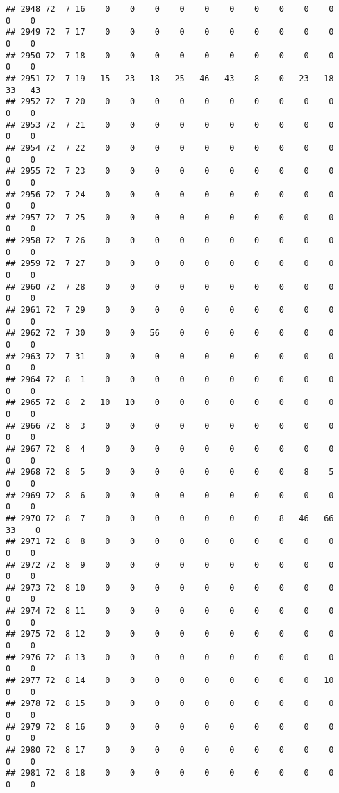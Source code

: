 \documentclass[]{article}
\begin{document}
\begin{verbatim}
## 2948 72  7 16    0    0    0    0    0    0    0    0    0    0    0    0
## 2949 72  7 17    0    0    0    0    0    0    0    0    0    0    0    0
## 2950 72  7 18    0    0    0    0    0    0    0    0    0    0    0    0
## 2951 72  7 19   15   23   18   25   46   43    8    0   23   18   33   43
## 2952 72  7 20    0    0    0    0    0    0    0    0    0    0    0    0
## 2953 72  7 21    0    0    0    0    0    0    0    0    0    0    0    0
## 2954 72  7 22    0    0    0    0    0    0    0    0    0    0    0    0
## 2955 72  7 23    0    0    0    0    0    0    0    0    0    0    0    0
## 2956 72  7 24    0    0    0    0    0    0    0    0    0    0    0    0
## 2957 72  7 25    0    0    0    0    0    0    0    0    0    0    0    0
## 2958 72  7 26    0    0    0    0    0    0    0    0    0    0    0    0
## 2959 72  7 27    0    0    0    0    0    0    0    0    0    0    0    0
## 2960 72  7 28    0    0    0    0    0    0    0    0    0    0    0    0
## 2961 72  7 29    0    0    0    0    0    0    0    0    0    0    0    0
## 2962 72  7 30    0    0   56    0    0    0    0    0    0    0    0    0
## 2963 72  7 31    0    0    0    0    0    0    0    0    0    0    0    0
## 2964 72  8  1    0    0    0    0    0    0    0    0    0    0    0    0
## 2965 72  8  2   10   10    0    0    0    0    0    0    0    0    0    0
## 2966 72  8  3    0    0    0    0    0    0    0    0    0    0    0    0
## 2967 72  8  4    0    0    0    0    0    0    0    0    0    0    0    0
## 2968 72  8  5    0    0    0    0    0    0    0    0    8    5    0    0
## 2969 72  8  6    0    0    0    0    0    0    0    0    0    0    0    0
## 2970 72  8  7    0    0    0    0    0    0    0    8   46   66   33    0
## 2971 72  8  8    0    0    0    0    0    0    0    0    0    0    0    0
## 2972 72  8  9    0    0    0    0    0    0    0    0    0    0    0    0
## 2973 72  8 10    0    0    0    0    0    0    0    0    0    0    0    0
## 2974 72  8 11    0    0    0    0    0    0    0    0    0    0    0    0
## 2975 72  8 12    0    0    0    0    0    0    0    0    0    0    0    0
## 2976 72  8 13    0    0    0    0    0    0    0    0    0    0    0    0
## 2977 72  8 14    0    0    0    0    0    0    0    0    0   10    0    0
## 2978 72  8 15    0    0    0    0    0    0    0    0    0    0    0    0
## 2979 72  8 16    0    0    0    0    0    0    0    0    0    0    0    0
## 2980 72  8 17    0    0    0    0    0    0    0    0    0    0    0    0
## 2981 72  8 18    0    0    0    0    0    0    0    0    0    0    0    0

\end{verbatim}
\end{document}
